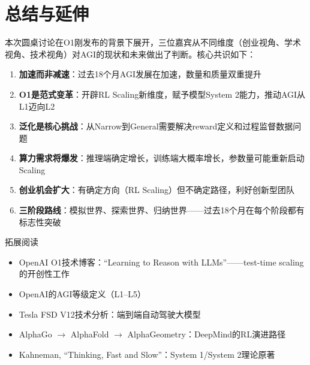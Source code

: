 \documentclass[a4paper]{article}
\begin{document}
\section{总结与延伸}

本次圆桌讨论在O1刚发布的背景下展开，三位嘉宾从不同维度（创业视角、学术视角、技术视角）对AGI的现状和未来做出了判断。核心共识如下：

\begin{enumerate}
\item \textbf{加速而非减速}：过去18个月AGI发展在加速，数量和质量双重提升
\item \textbf{O1是范式变革}：开辟RL Scaling新维度，赋予模型System 2能力，推动AGI从L1迈向L2
\item \textbf{泛化是核心挑战}：从Narrow到General需要解决reward定义和过程监督数据问题
\item \textbf{算力需求将爆发}：推理端确定增长，训练端大概率增长，参数量可能重新启动Scaling
\item \textbf{创业机会扩大}：有确定方向（RL Scaling）但不确定路径，利好创新型团队
\item \textbf{三阶段路线}：模拟世界、探索世界、归纳世界——过去18个月在每个阶段都有标志性突破
\end{enumerate}

\begin{knowledgebox}{拓展阅读}
\begin{itemize}
\item OpenAI O1技术博客：``Learning to Reason with LLMs''——test-time scaling的开创性工作
\item OpenAI的AGI等级定义（L1--L5）
\item Tesla FSD V12技术分析：端到端自动驾驶大模型
\item AlphaGo $\rightarrow$ AlphaFold $\rightarrow$ AlphaGeometry：DeepMind的RL演进路径
\item Kahneman, ``Thinking, Fast and Slow''：System 1/System 2理论原著
\end{itemize}
\end{knowledgebox}

\end{document}
